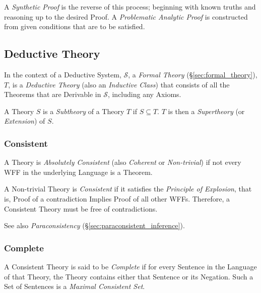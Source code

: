 A \emph{Synthetic Proof} is the reverse of this process; beginning
with known truths and reasoning up to the desired Proof. A
\emph{Problematic Analytic Proof} is constructed from given conditions
that are to be satisfied.



\subsection{Deductive Theory}\label{sec:deductive_theory}

In the context of a Deductive System, $\mathcal{S}$, a \emph{Formal
  Theory} (\S\ref{sec:formal_theory}), $T$, is a \emph{Deductive
  Theory} (also an \emph{Inductive Class}) that consists of all the
Theorems that are Derivable in $\mathcal{S}$, including any Axioms.

A Theory $S$ is a \emph{Subtheory} of a Theory $T$ if $S \subseteq T$.
$T$ is then a \emph{Supertheory} (or \emph{Extension}) of $S$.



\subsubsection{Consistent}\label{sec:consistent_theory}

A Theory is \emph{Absolutely Consistent} (also \emph{Coherent} or
\emph{Non-trivial}) if not every WFF in the underlying Language is a
Theorem.

A Non-trivial Theory is \emph{Consistent} if it satisfies the
\emph{Principle of Explosion}, that is, Proof of a contradiction
Implies Proof of all other WFFs. Therefore, a Consistent Theory must
be free of contradictions.

See also \emph{Paraconsistency} (\S\ref{sec:paraconsistent_inference}).



\subsubsection{Complete}\label{sec:complete_theory}

A Consistent Theory is said to be \emph{Complete} if for every
Sentence in the Language of that Theory, the Theory contains either
that Sentence or its Negation. Such a Set of Sentences is a
\emph{Maximal Consistent Set}.



